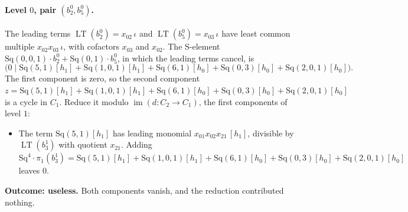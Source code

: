 \documentclass[11pt]{article}
\newcommand{\Sq}{\mathrm{Sq}}
\DeclareMathOperator{\LT}{LT}
\begin{document}
\paragraph{Level $0$, pair $(b^{0}_{2}, b^{0}_{5})$.} The leading terms $\LT(b^{0}_{2}) = x_{02}\,\iota$ and $\LT(b^{0}_{5}) = x_{03}\,\iota$ have least common multiple $x_{02}x_{03}\,\iota$, with cofactors $x_{03}$ and $x_{02}$. The S-element $\Sq(0,0,1)\cdot b^{0}_{2} + \Sq(0,1)\cdot b^{0}_{5}$, in which the leading terms cancel, is
\[\bigl(0 \;\big|\; \Sq(5,1)[h_1] + \Sq(1,0,1)[h_1] + \Sq(6,1)[h_0] + \Sq(0,3)[h_0] + \Sq(2,0,1)[h_0]\bigr).\]
The first component is zero, so the second component $z = \Sq(5,1)[h_1] + \Sq(1,0,1)[h_1] + \Sq(6,1)[h_0] + \Sq(0,3)[h_0] + \Sq(2,0,1)[h_0]$ is a cycle in $C_{1}$.
Reduce it modulo $\operatorname{im}(d\colon C_{2}\to C_{1})$, the first components of level $1$:
\begin{itemize}
\item The term $\Sq(5,1)[h_1]$ has leading monomial $x_{01}x_{02}x_{21}\,[h_1]$, divisible by $\LT(b^{1}_{3})$ with quotient $x_{21}$. Adding $\Sq^{4}\cdot \pi_1(b^{1}_{3}) = \Sq(5,1)[h_1] + \Sq(1,0,1)[h_1] + \Sq(6,1)[h_0] + \Sq(0,3)[h_0] + \Sq(2,0,1)[h_0]$ leaves $0$.
\end{itemize}
\textbf{Outcome: useless.} Both components vanish, and the reduction contributed nothing.
\medskip
\end{document}
